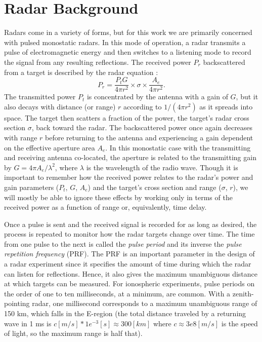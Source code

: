 \chapter{Radar Background}
\label{radar_background}
Radars come in a variety of forms, but for this work we are primarily concerned with pulsed monostatic radars. In this mode of operation, a radar transmits a pulse of electromagnetic energy and then switches to a listening mode to record the signal from any resulting reflections. The received power $P_r$ backscattered from a target is described by the radar equation \autocite{Sko01}:
\begin{equation}\label{eq:radar_equation}
 P_r = \frac{P_t G}{4\pi r^2} \times \sigma \times \frac{A_e}{4\pi r^2}.
\end{equation}
The transmitted power $P_t$ is concentrated by the antenna with a gain of $G$, but it also decays with distance (or range) $r$ according to $1/(4\pi r^2)$ as it spreads into space. The target then scatters a fraction of the power, the target's radar cross section $\sigma$, back toward the radar. The backscattered power once again decreases with range $r$ before returning to the antenna and experiencing a gain dependent on the effective aperture area $A_e$. In this monostatic case with the transmitting and receiving antenna co-located, the aperture is related to the transmitting gain by $G = 4\pi A_e/\lambda^2$, where $\lambda$ is the wavelength of the radio wave. Though it is important to remember how the received power relates to the radar's power and gain parameters ($P_t$, $G$, $A_e$) and the target's cross section and range ($\sigma$, $r$), we will mostly be able to ignore these effects by working only in terms of the received power as a function of range or, equivalently, time delay.

Once a pulse is sent and the received signal is recorded for as long as desired, the process is repeated to monitor how the radar targets change over time. The time from one pulse to the next is called the \emph{pulse period} and its inverse the \emph{pulse repetition frequency} (PRF). The PRF is an important parameter in the design of a radar experiment since it specifies the amount of time during which the radar can listen for reflections. Hence, it also gives the maximum unambiguous distance at which targets can be measured. For ionospheric experiments, pulse periods on the order of one to ten milliseconds, at a minimum, are common. With a zenith-pointing radar, one millisecond corresponds to a maximum unambiguous range of 150 km, which falls in the E-region (the total distance traveled by a returning wave in 1 ms is $c [m/s] * 1e^{-3} [s] \approx 300 [km]$ where $c \approx 3e8 [m/s]$ is the speed of light, so the maximum range is half that).

